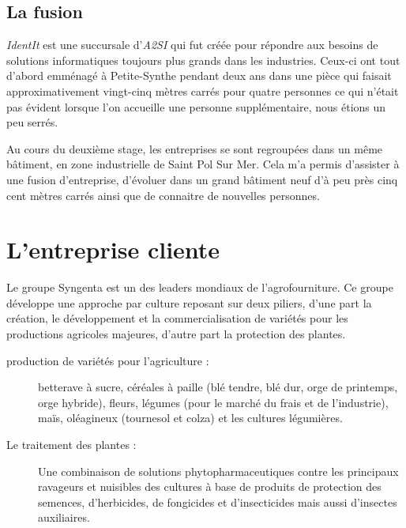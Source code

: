 
\subsection{La fusion} %
\label{sub:La fusion}

\emph{IdentIt} est une succursale d'\emph{A2SI} qui fut créée pour
répondre aux besoins de solutions informatiques toujours plus grands
dans les industries. Ceux-ci ont tout d'abord emménagé à Petite-Synthe
pendant deux ans dans une pièce qui faisait approximativement vingt-cinq
mètres carrés pour quatre personnes ce qui n'était pas évident lorsque
l'on accueille une personne supplémentaire, nous étions un peu serrés.

Au cours du deuxième stage, les entreprises se sont regroupées dans un
même bâtiment, en zone industrielle de Saint Pol Sur Mer. Cela m'a
permis d'assister à une \og fusion \fg{} d'entreprise, d'évoluer dans un
grand bâtiment neuf d'à peu près cinq cent mètres carrés ainsi que de
connaitre de nouvelles personnes.



\section{L'entreprise cliente} %
\label{sec:L'entreprise cliente}

Le groupe Syngenta est un des leaders mondiaux de l’agrofourniture.  Ce
groupe développe une approche par culture reposant sur deux piliers,
d'une part la création, le développement et la commercialisation de
variétés pour les productions agricoles majeures, d'autre part la
protection des plantes.

\begin{description}

  \item[production de variétés pour l'agriculture :] betterave à sucre,
    céréales à paille (blé tendre, blé dur, orge de printemps, orge
    hybride), fleurs, légumes (pour le marché du frais et de
    l’industrie), maïs, oléagineux (tournesol et colza) et les cultures
    légumières.

  \item[Le traitement des plantes :] Une combinaison de solutions
    phytopharmaceutiques contre les principaux ravageurs et nuisibles
    des cultures à base de produits de protection des semences,
    d’herbicides, de fongicides et d’insecticides mais aussi d’insectes
    auxiliaires.

\end{description}


